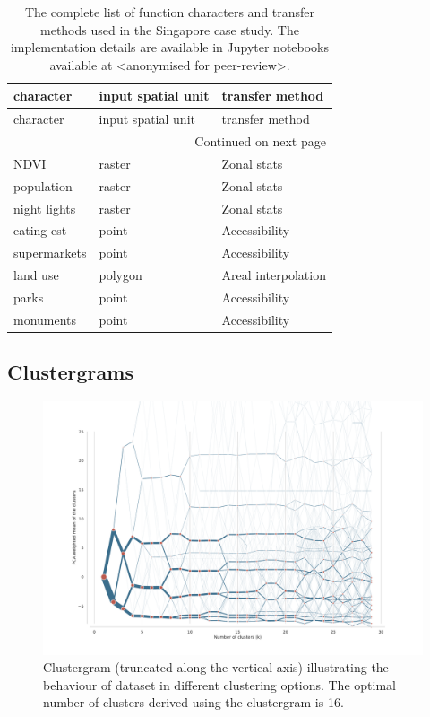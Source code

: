 \begin{longtable}{p{5cm}p{3cm}p{5cm}}
    \caption{The complete list of function characters and transfer methods used in the Singapore case study. The implementation details are available
    in Jupyter notebooks available at <anonymised for peer-review>.}
    \label{tab:fn_sin} \\
    \toprule
                                                character & input spatial unit &                                    transfer method \\
    \midrule
    \endfirsthead

    \toprule
                                                character & input spatial unit &                                    transfer method \\
    \midrule
    \endhead
    \midrule
    \multicolumn{3}{r}{{Continued on next page}} \\
    \midrule
    \endfoot

    \bottomrule
    \endlastfoot
    NDVI &  raster &         Zonal stats \\
population &  raster &         Zonal stats \\
night lights &  raster &         Zonal stats \\
eating est &   point &       Accessibility \\
supermarkets &   point &       Accessibility \\
land use & polygon & Areal interpolation \\
   parks &   point &       Accessibility \\
monuments &   point &       Accessibility \\
\end{longtable}

\normalsize

\subsection{Clustergrams}

\begin{figure}
    \includegraphics[width=\linewidth]{figures/clustergram_bcn.pdf}
    \caption{Clustergram (truncated along the vertical axis) illustrating the behaviour of dataset in different clustering options. The optimal number of clusters derived using the clustergram is 16.}
    \label{fig:cgram_bcn}
\end{figure}

